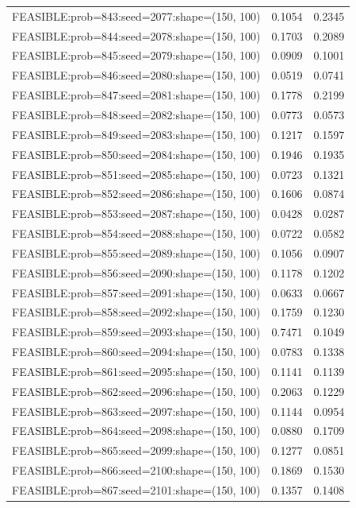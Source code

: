 \begin{longtable}{lcc}
FEASIBLE:prob=843:seed=2077:shape=(150, 100) &   0.1054 & 0.2345 \\
FEASIBLE:prob=844:seed=2078:shape=(150, 100) &   0.1703 & 0.2089 \\
FEASIBLE:prob=845:seed=2079:shape=(150, 100) &   0.0909 & 0.1001 \\
FEASIBLE:prob=846:seed=2080:shape=(150, 100) &   0.0519 & 0.0741 \\
FEASIBLE:prob=847:seed=2081:shape=(150, 100) &   0.1778 & 0.2199 \\
FEASIBLE:prob=848:seed=2082:shape=(150, 100) &   0.0773 & 0.0573 \\
FEASIBLE:prob=849:seed=2083:shape=(150, 100) &   0.1217 & 0.1597 \\
FEASIBLE:prob=850:seed=2084:shape=(150, 100) &   0.1946 & 0.1935 \\
FEASIBLE:prob=851:seed=2085:shape=(150, 100) &   0.0723 & 0.1321 \\
FEASIBLE:prob=852:seed=2086:shape=(150, 100) &   0.1606 & 0.0874 \\
FEASIBLE:prob=853:seed=2087:shape=(150, 100) &   0.0428 & 0.0287 \\
FEASIBLE:prob=854:seed=2088:shape=(150, 100) &   0.0722 & 0.0582 \\
FEASIBLE:prob=855:seed=2089:shape=(150, 100) &   0.1056 & 0.0907 \\
FEASIBLE:prob=856:seed=2090:shape=(150, 100) &   0.1178 & 0.1202 \\
FEASIBLE:prob=857:seed=2091:shape=(150, 100) &   0.0633 & 0.0667 \\
FEASIBLE:prob=858:seed=2092:shape=(150, 100) &   0.1759 & 0.1230 \\
FEASIBLE:prob=859:seed=2093:shape=(150, 100) &   0.7471 & 0.1049 \\
FEASIBLE:prob=860:seed=2094:shape=(150, 100) &   0.0783 & 0.1338 \\
FEASIBLE:prob=861:seed=2095:shape=(150, 100) &   0.1141 & 0.1139 \\
FEASIBLE:prob=862:seed=2096:shape=(150, 100) &   0.2063 & 0.1229 \\
FEASIBLE:prob=863:seed=2097:shape=(150, 100) &   0.1144 & 0.0954 \\
FEASIBLE:prob=864:seed=2098:shape=(150, 100) &   0.0880 & 0.1709 \\
FEASIBLE:prob=865:seed=2099:shape=(150, 100) &   0.1277 & 0.0851 \\
FEASIBLE:prob=866:seed=2100:shape=(150, 100) &   0.1869 & 0.1530 \\
FEASIBLE:prob=867:seed=2101:shape=(150, 100) &   0.1357 & 0.1408 \\

\end{longtable}
